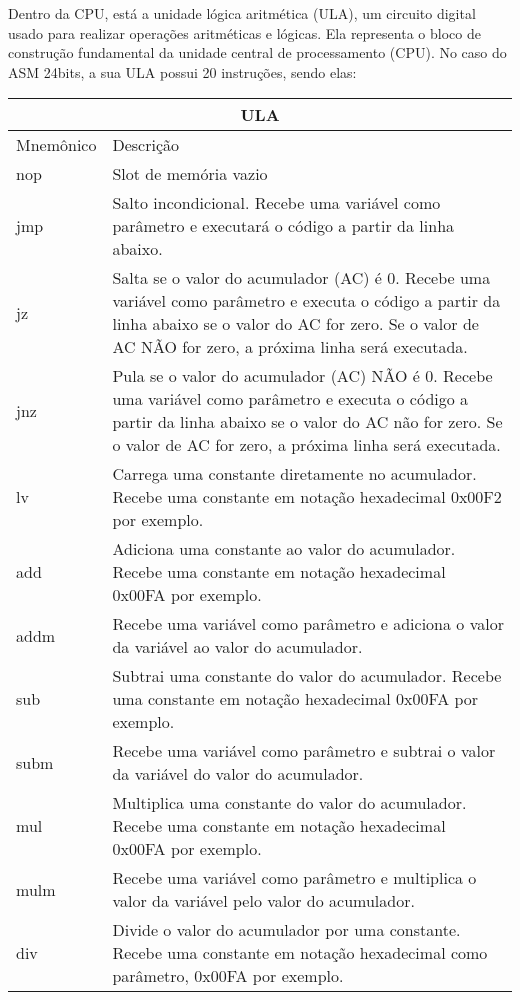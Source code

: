 Dentro da CPU, está a unidade lógica aritmética (ULA), um circuito digital usado para realizar operações aritméticas e lógicas. Ela representa o bloco de construção fundamental da unidade central de processamento (CPU). No caso do ASM 24bits, a sua ULA possui 20 instruções, sendo elas:

\vspace{1cm}
\begin{longtable}{ |p{3cm}||p{11cm}|  }
  \hline
  \multicolumn{2}{|c|}{ULA} \\
  \hline
  Mnemônico &
  Descrição\\
  \hline
  nop &
  Slot de memória vazio \\
  \hline
  jmp &
  Salto incondicional. Recebe uma variável como parâmetro e executará o código a partir da linha abaixo. \\
  \hline
  jz &
  Salta se o valor do acumulador (AC) é 0. Recebe uma variável como parâmetro e executa o código a partir da linha abaixo se o valor do AC for zero. Se o valor de AC NÃO for zero, a próxima linha será executada. \\
  \hline
  jnz &
  Pula se o valor do acumulador (AC) NÃO é 0. Recebe uma variável como parâmetro e executa o código a partir da linha abaixo se o valor do AC não for zero. Se o valor de AC for zero, a próxima linha será executada. \\
  \hline
  lv &
  Carrega uma constante diretamente no acumulador. Recebe uma constante em notação hexadecimal 0x00F2 por exemplo. \\
  \hline
  add &
  Adiciona uma constante ao valor do acumulador. Recebe uma constante em notação hexadecimal 0x00FA por exemplo. \\
  \hline
  addm &
  Recebe uma variável como parâmetro e adiciona o valor da variável ao valor do acumulador. \\
  \hline
  sub &
  Subtrai uma constante do valor do acumulador. Recebe uma constante em notação hexadecimal 0x00FA por exemplo. \\
  \hline
  subm &
  Recebe uma variável como parâmetro e subtrai o valor da variável do valor do acumulador. \\
  \hline
  mul &
  Multiplica uma constante do valor do acumulador. Recebe uma constante em notação hexadecimal 0x00FA por exemplo. \\
  \hline
  mulm &
  Recebe uma variável como parâmetro e multiplica o valor da variável pelo valor do acumulador. \\
  \hline
  div &
  Divide o valor do acumulador por uma constante. Recebe uma constante em notação hexadecimal como parâmetro, 0x00FA por exemplo. \\

\end{longtable}
